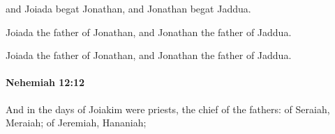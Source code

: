 			\begin{versebox}
					\item[BHS] 
					\item[LXX] 
					\item[ASV] and Joiada begat Jonathan, and Jonathan begat Jaddua.
					\item[NIV] Joiada the father of Jonathan, and Jonathan the father of Jaddua.
					\item[NRSV] Joiada the father of Jonathan, and Jonathan the father of Jaddua.
			\end{versebox}

		\paragraph{Nehemiah 12:12} %
			\label{NEHEMIAH-12-12}

			And in the days of Joiakim were priests, the chief of the fathers: of Seraiah, Meraiah; of Jeremiah, Hananiah;

